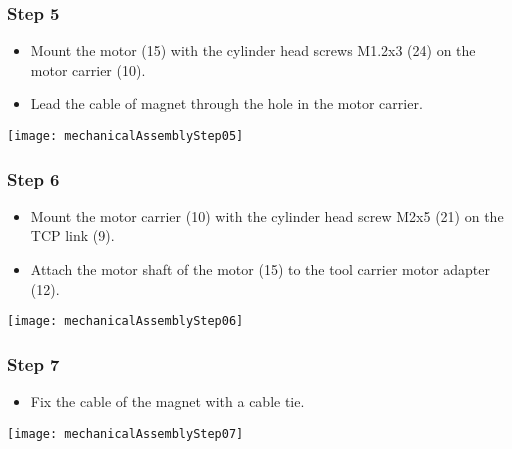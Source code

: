 \subsubsection{Step 5}

\begin{minipage}[t]{0.6\textwidth}
	\begin{itemize}
		\item Mount the motor (15) with the cylinder head screws M1.2x3 (24) on the motor carrier (10).
		\item Lead the cable of magnet through the hole in the motor carrier.
	\end{itemize}
\end{minipage}
\hfill
\begin{minipage}[t]{0.35\textwidth}
	\vspace{-\ht\strutbox}\texttt{[image: mechanicalAssemblyStep05]}
	\label{fig:MechanicalAssebmlyStep05} 
\end{minipage}

\subsubsection{Step 6}

\begin{minipage}[t]{0.6\textwidth}
	\begin{itemize}
		\item Mount the motor carrier (10) with the cylinder head screw M2x5 (21) on the TCP link (9). 
		\item Attach the motor shaft of the motor (15) to the tool carrier motor adapter (12).
	\end{itemize}
\end{minipage}
\hfill
\begin{minipage}[t]{0.35\textwidth}
	\vspace{-\ht\strutbox}\texttt{[image: mechanicalAssemblyStep06]}
	\label{fig:MechanicalAssebmlyStep06} 
\end{minipage}

\subsubsection{Step 7}

\begin{minipage}[t]{0.6\textwidth}
	\begin{itemize}
		\item Fix the cable of the magnet with a cable tie.
	\end{itemize}
\end{minipage}
\hfill
\begin{minipage}[t]{0.35\textwidth}
	\vspace{-\ht\strutbox}\texttt{[image: mechanicalAssemblyStep07]}
	\label{fig:MechanicalAssebmlyStep07} 
\end{minipage}


